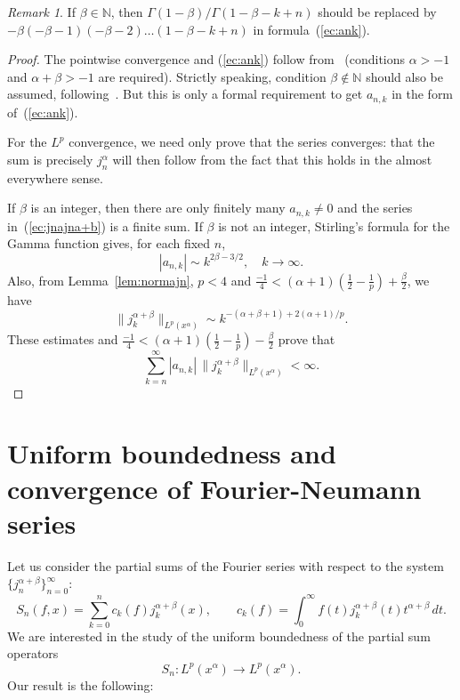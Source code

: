 \documentclass[reqno]{amsart}
\theoremstyle{plain}
\theoremstyle{definition}
\theoremstyle{remark}
\newtheorem*{Rem}{Remark}
\newcommand{\lpnorm}[3]{\|{#1}\|_{L^{#2}({#3})}} %
\begin{document}
\begin{Rem}
If $\beta \in \mathbb{N}$, then $\Gamma(1-\beta) / \Gamma(1-\beta-k+n)$ should
be replaced by $-\beta (-\beta -1) (-\beta -2) \dots (1-\beta-k+n)$ in
formula~(\ref{ec:ank}).
\end{Rem}

\begin{proof}
The pointwise convergence and (\ref{ec:ank}) follow from~\cite[Ch.~V,
5.21 (1), p.~139]{Wat} (conditions $\alpha > -1$ and $\alpha + \beta > -1$ are
required). Strictly speaking, condition $\beta \notin \mathbb{N}$ should also
be assumed, following~\cite{Wat}. But this is only a formal requirement to get
$a_{n,k}$ in the form of~(\ref{ec:ank}).

For the $L^p$ convergence, we need only prove that the series converges:
that the sum is precisely $j_n^\alpha$ will then follow from the fact that
this holds in the almost everywhere sense.

If $\beta$ is an integer, then there are only finitely many $a_{n,k} \not= 0$
and the series in~(\ref{ec:jnajna+b}) is a finite sum. If $\beta$ is not an
integer, Stirling's formula for the Gamma function gives, for each fixed
$n$,
\begin{equation*}
    |a_{n,k}| \sim k^{2\beta-3/2}, \quad k \to \infty.
\end{equation*}
Also, from Lemma~\ref{lem:normajn}, $p < 4$ and $\frac{-1}4 <
(\alpha+1)\left(\frac12-\frac1p\right) + \frac{\beta}2$, we have
\begin{equation*}
    \lpnorm{j_k^{\alpha+\beta}}{p}{x^\alpha}
      \sim k^{-(\alpha+\beta+1)+2(\alpha+1)/p}.
\end{equation*}
These estimates and $\frac{-1}4 < (\alpha+1)\left(\frac12-\frac1p\right) -
\frac{\beta}2$ prove that
\begin{equation*}
    \sum_{k=n}^\infty |a_{n,k}| \, \lpnorm{j_k^{\alpha+\beta}}{p}{x^\alpha}
   < \infty.
\end{equation*}
\end{proof}

\section{Uniform boundedness and convergence of Fourier-Neumann series}
\label{sec:convergence}

Let us consider the partial sums of the Fourier series with respect to the
system
$\{j_n^{\alpha+\beta}\}_{n=0}^\infty$:
\begin{equation*}
   S_n(f,x) = \sum_{k=0}^n {c_k(f) j_k^{\alpha+\beta} (x)}, \qquad
   c_k(f) = \int_0^\infty {f(t) j_k^{\alpha+\beta}(t) t^{\alpha+\beta}\,dt}.
\end{equation*}
We are interested in the study of the uniform boundedness of
the partial sum operators
\begin{equation*}
    S_n \colon L^p(x^\alpha) \longrightarrow L^p(x^\alpha).
\end{equation*}
Our result is the following:
\end{document}
